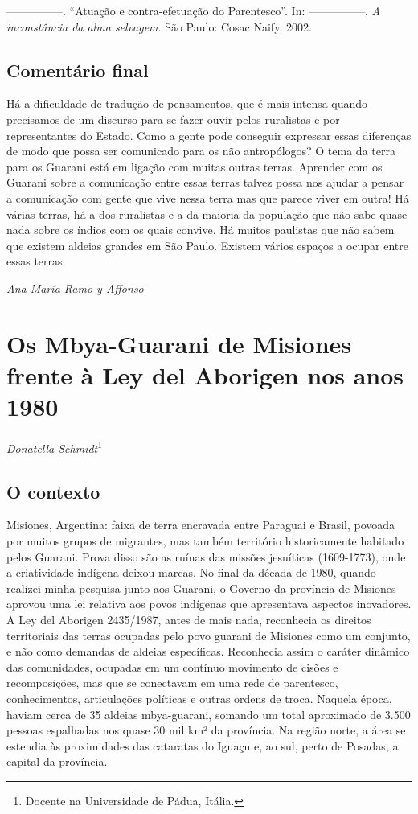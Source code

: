 —————. ``Atuação e contra-efetuação do Parentesco''. In: —————. \emph{A inconstância da
alma selvagem}. São Paulo: Cosac Naify, 2002.

\section{Comentário final}
Há a dificuldade de tradução de pensamentos, que é mais intensa quando
precisamos de um discurso para se fazer ouvir pelos ruralistas e por
representantes do Estado. Como a gente pode conseguir expressar essas
diferenças de modo que possa ser comunicado para os não antropólogos? O
tema da terra para os Guarani está em ligação com muitas outras terras.
Aprender com os Guarani sobre a comunicação entre essas terras talvez
possa nos ajudar a pensar a comunicação com gente que vive nessa terra
mas que parece viver em outra! Há várias terras, há a dos ruralistas e
a da maioria da população que não sabe quase nada sobre os índios com
os quais convive. Há muitos paulistas que não sabem que existem aldeias
grandes em São Paulo. Existem vários espaços a ocupar entre essas
terras. 
\medskip
\begin{flushright}
\emph{Ana María Ramo y Affonso}
\end{flushright}

\chapter{Os Mbya-Guarani de Misiones frente à Ley del Aborigen nos anos 1980}
\begin{flushright}
\emph{Donatella Schmidt}\footnote{Docente na Universidade de Pádua, Itália.}
\end{flushright}
\medskip

\section{O contexto}

Misiones, Argentina: faixa de terra encravada entre Paraguai e Brasil,
povoada por muitos grupos de migrantes, mas também território
historicamente habitado pelos Guarani. Prova disso são as ruínas das
missões jesuíticas (1609-1773), onde a criatividade indígena deixou
marcas. No final da década de 1980, quando realizei minha pesquisa
junto aos Guarani, o Governo da província de Misiones aprovou uma lei
relativa aos povos indígenas que apresentava aspectos inovadores. A Ley
del Aborigen 2435/1987, antes de mais nada, reconhecia os direitos
territoriais das terras ocupadas pelo povo guarani de Misiones como um
conjunto, e não como demandas de aldeias específicas. Reconhecia assim
o caráter dinâmico das comunidades, ocupadas em um contínuo movimento
de cisões e recomposições, mas que se conectavam em uma rede de
parentesco, conhecimentos, articulações políticas e outras ordens de
troca. Naquela época, haviam cerca de 35 aldeias mbya-guarani, somando
um total aproximado de 3.500 pessoas espalhadas nos quase 30 mil km² da
província. Na região norte, a área se estendia às proximidades das
cataratas do Iguaçu e, ao sul, perto de Posadas, a capital da
província.


